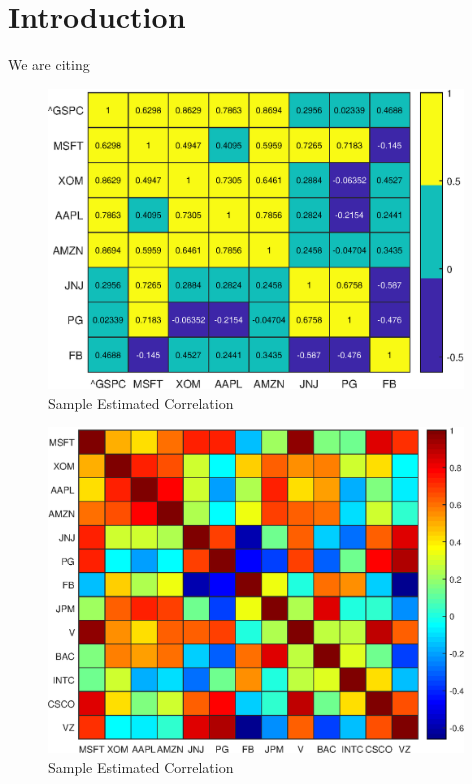      \section{Introduction}

     We are citing \cite[see p.500]{Gratzer2007} \cite{article} \cite{book}  \cite{booklet} \cite{inbook}\\
     
     \blindmathtrue
     \blindmathpaper
     
     \begin{figure}[!ht]
         \centering
         \includegraphics[width=110mm]{Chapters/Chapter_1/Figures_1/covar.eps}
         \caption{Sample Estimated Correlation}
         \label{fig:Sample Covariance}
     \end{figure}
     
     \begin{figure}[!ht]
         \centering
         \includegraphics[width=110mm]{Chapters/Chapter_1/Figures_1/covar2.eps}
         \caption{Sample Estimated Correlation}
         \label{fig:Sample Covariance}
     \end{figure}


